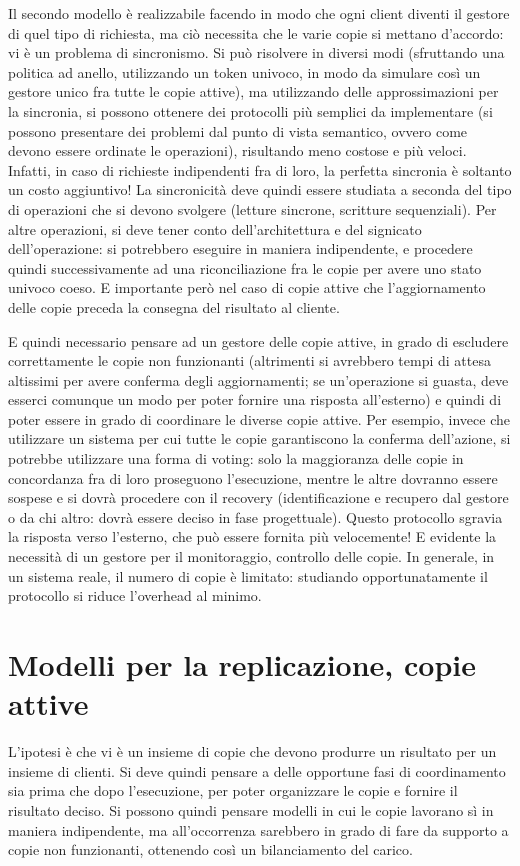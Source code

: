 Il secondo modello è realizzabile facendo in modo che ogni client diventi il 
gestore di quel tipo di richiesta, ma
ciò necessita che le varie copie si mettano d'accordo: vi è un problema di 
sincronismo. Si può risolvere in diversi
modi (sfruttando una politica ad anello, utilizzando un token univoco, in modo 
da simulare così un gestore unico fra
tutte le copie attive), ma utilizzando delle approssimazioni per la sincronia, 
si possono ottenere dei protocolli più
semplici da implementare (si possono presentare dei problemi dal punto di vista 
semantico, ovvero come devono essere
ordinate le operazioni), risultando meno costose e più veloci. Infatti, in caso 
di richieste indipendenti fra di loro,
la perfetta sincronia è soltanto un costo aggiuntivo! La sincronicità deve 
quindi essere studiata a seconda del tipo di
operazioni che si devono svolgere (letture sincrone, scritture sequenziali). 
Per altre operazioni, si deve tener conto
dell'architettura e del signicato dell'operazione: si potrebbero eseguire in 
maniera indipendente, e procedere quindi
successivamente ad una riconciliazione fra le copie per avere uno stato univoco 
coeso. E importante però nel caso di
copie attive che l'aggiornamento delle copie preceda la consegna del risultato 
al cliente.

E quindi necessario pensare ad un gestore delle copie attive, in grado di 
escludere correttamente le copie non
funzionanti (altrimenti si avrebbero tempi di attesa altissimi per avere 
conferma degli aggiornamenti; se un'operazione
si guasta, deve esserci comunque un modo per poter fornire una risposta 
all'esterno) e quindi di poter essere in grado
di coordinare le diverse copie attive. Per esempio, invece che utilizzare un 
sistema per cui tutte le copie garantiscono
la conferma dell'azione, si potrebbe utilizzare una forma di voting: solo la 
maggioranza delle copie in concordanza fra
di loro proseguono l'esecuzione, mentre le altre dovranno essere sospese e si 
dovrà procedere con il recovery
(identificazione e recupero dal gestore o da chi altro: dovrà essere deciso in 
fase progettuale).
Questo protocollo sgravia la risposta verso l'esterno, che può essere fornita 
più velocemente! E evidente la necessità
di un gestore per il monitoraggio, controllo delle copie. In generale, in un 
sistema reale, il numero di copie è
limitato: studiando opportunatamente il protocollo si riduce l'overhead al 
minimo.
\section{Modelli per la replicazione, copie attive}
L'ipotesi è che vi è un insieme di copie che devono produrre un risultato per 
un insieme di clienti. Si deve quindi
pensare a delle opportune fasi di coordinamento sia prima che dopo 
l'esecuzione, per poter organizzare le copie e
fornire il risultato deciso. Si possono quindi pensare modelli in cui le copie 
lavorano sì in maniera indipendente,
ma all'occorrenza sarebbero in grado di fare da supporto a copie non 
funzionanti, ottenendo così un bilanciamento del
carico.

